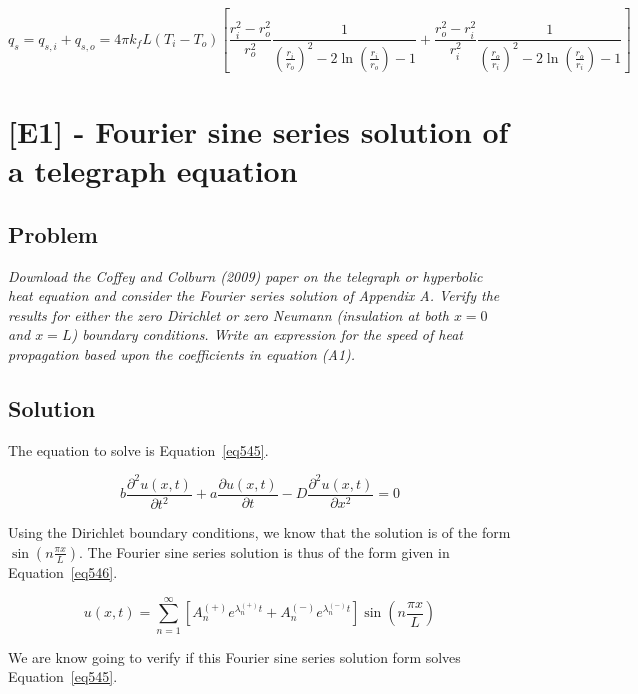 \begin{equation}\label{eq544}
q_s = q_{s,i} + q_{s,o} = 4\pi k_f L (T_i - T_o) \left[ \frac{r_i^2 - r_o^2}{r_o^2}\frac{1}{\left( \frac{r_i}{r_o} \right)^2 - 2\ln \left( \frac{r_i}{r_o} \right) - 1} + \frac{r_o^2 - r_i^2}{r_i^2}\frac{1}{\left( \frac{r_o}{r_i} \right)^2 - 2\ln \left( \frac{r_o}{r_i} \right) - 1} \right]
\end{equation}


\section{[E1] - Fourier sine series solution of a telegraph equation}
\label{prob53}

\subsection{Problem}
\textit{Download the Coffey and Colburn (2009) paper on the telegraph or hyperbolic heat equation and consider the Fourier series solution of Appendix A. Verify the results for either the zero Dirichlet or zero Neumann (insulation at both $x = 0$ and $x = L$) boundary conditions. Write an expression for the speed of heat propagation based upon the coefficients in equation (A1).}

\subsection{Solution}

The equation to solve is Equation~\ref{eq545}.

\begin{equation}\label{eq545}
b\frac{\partial^2 u(x,t)}{\partial t^2} + a\frac{\partial u(x,t)}{\partial t} - D\frac{\partial^2 u(x,t)}{\partial x^2} = 0
\end{equation}

Using the Dirichlet boundary conditions, we know that the solution is of the form $\sin \left( n\frac{\pi x}{L} \right)$. The Fourier sine series solution is thus of the form given in Equation~\ref{eq546}.

\begin{equation}\label{eq546}
u(x,t) = \sum_{n=1}^{\infty} \left[ A_n^{(+)}e^{\lambda_n^{(+)}t} + A_n^{(-)}e^{\lambda_n^{(-)}t} \right] \sin \left( n\frac{\pi x}{L} \right)
\end{equation}

We are know going to verify if this Fourier sine series solution form solves Equation~\ref{eq545}.

